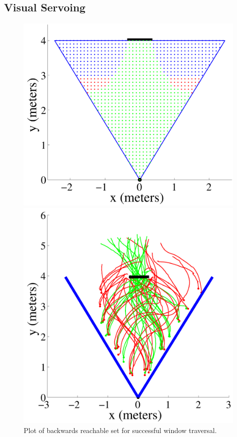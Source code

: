 \documentclass{aamas2013}
\begin{document}
\subsection{Visual Servoing}
\label{sec:visual_servoing}

\begin{figure}[tb]
\begin{minipage}[b]{0.45\linewidth}
\centering
\includegraphics[width=\textwidth]{figures/feasible_set.pdf}
\caption{Plot of backwards reachable set for successful window traversal.}
\label{fig:feasible_set}
\end{minipage}
\hspace{0.5cm}
\begin{minipage}[b]{0.45\linewidth}
\centering
\includegraphics[width=\textwidth]{figures/flight_paths.pdf}

\end{minipage}
\end{figure}
\end{document}
